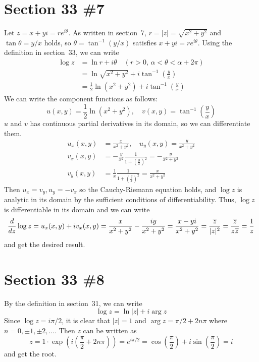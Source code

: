 \documentclass{scrartcl}
\newcommand\Overline[2][0.4pt]{%
  \begin{tikzpicture}[baseline=(a.base)]
    \node[inner xsep=0pt,inner ysep=1.5pt] (a) {$#2$};
    \draw[line width= #1] (a.north west) -- (a.north east);
  \end{tikzpicture}
}
\begin{document}
\section{Section 33 \#7}
Let \(z = x + yi = re^{i\theta}\).
As written in section~7, \(r = |z| = \sqrt{x^2 + y^2}\) and \(\tan \theta = y / x\) holds, so \(\theta = \tan^{-1} (y / x)\) satisfies \(x + yi = re^{i\theta}\).
Using the definition in section~33, we can write
\begin{align*}
  \log z &= \ln r + i\theta \quad (r > 0,\, \alpha < \theta < \alpha + 2\pi) \\
         &= \ln \sqrt{x^2 + y^2} + i\tan^{-1} \left( \frac{y}{x} \right) \\
         &= \frac{1}{2} \ln (x^2 + y^2) + i\tan^{-1} \left( \frac{y}{x} \right)
\end{align*}
We can write the component functions as follows:
\[
  u(x, y) = \frac{1}{2} \ln (x^2 + y^2), \quad v(x, y) = \tan^{-1} \left( \frac{y}{x} \right)
\]
\(u\) and \(v\) has continuous partial derivatives in its domain, so we can differentiate them.
\begin{align*}
  u_x(x, y) &= \frac{x}{x^2 + y^2}, \quad u_y(x, y) = \frac{y}{x^2 + y^2} \\
  v_x(x, y) &= -\frac{y}{x^2} \frac{1}{1 + \left( \frac{y}{x} \right)^2} = -\frac{y}{x^2 + y^2} \\
  v_y(x, y) &= \frac{1}{x} \frac{1}{1 + \left( \frac{y}{x} \right)^2} = \frac{x}{x^2 + y^2}
\end{align*}
Then \(u_x = v_y, u_y = -v_x\) so the Cauchy-Riemann equation holds, and \(\log z\) is analytic in its domain by the sufficient conditions of differentiability.
Thus, \(\log z\) is differentiable in its domain and we can write
\[
  \frac{d}{dz} \log z = u_x(x, y) + iv_x(x, y) = \frac{x}{x^2 + y^2} - \frac{iy}{x^2 + y^2} = \frac{x - yi}{x^2 + y^2} = \frac{\Overline{z}}{|z|^2} = \frac{\Overline{z}}{z\Overline{z}} = \frac{1}{z}
\]
and get the desired result.

\section{Section 33 \#8}
By the definition in section~31, we can write
\[
  \log z = \ln |z| + i \arg z
\]
Since \(\log z = i\pi / 2\), it is clear that \(|z| = 1\) and \(\arg z = \pi / 2 + 2n\pi\) where \(n = 0, \pm 1, \pm 2, \dots\). Then \(z\) can be written as
\[
  z = 1 \cdot \exp \left( i \left( \frac{\pi}{2} + 2n\pi \right) \right) = e^{i\pi / 2} = \cos \left( \frac{\pi}{2} \right) + i\sin \left( \frac{\pi}{2} \right) = i
\]
and get the root.
\end{document}
